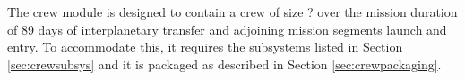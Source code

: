 The crew module is designed to contain a crew of size ? over the mission duration of 89 days of interplanetary transfer and adjoining mission segments launch and entry. To accommodate this, it requires the subsystems listed in Section \ref{sec:crewsubsys} and it is packaged as described in Section \ref{sec:crewpackaging}.

